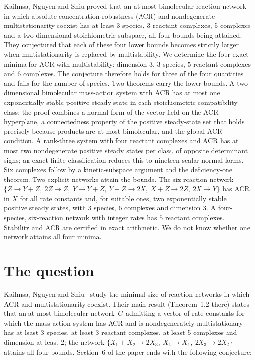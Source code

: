 \documentclass[11pt,a4paper]{report}
\begin{document}
\makepapertitle

\begin{paperabstract}
Kaihnsa, Nguyen and Shiu proved that an at-most-bimolecular reaction network in which absolute concentration
robustness (ACR) and nondegenerate multistationarity coexist has at least 3 species, 3 reactant complexes,
5 complexes and a two-dimensional stoichiometric subspace, all four bounds being attained. They conjectured that
each of these four lower bounds becomes strictly larger when multistationarity is replaced by multistability. We
determine the four exact minima for ACR with multistability: dimension $3$, $3$ species, $5$ reactant complexes and
$6$ complexes. The conjecture therefore holds for three of the four quantities and fails for the number of species.
Two theorems carry the lower bounds. A two-dimensional bimolecular mass-action system with ACR has at most one
exponentially stable positive steady state in each stoichiometric compatibility class; the proof combines a normal
form of the vector field on the ACR hyperplane, a connectedness property of the positive steady-state set that holds
precisely because products are at most bimolecular, and the global ACR condition. A rank-three system with four
reactant complexes and ACR has at most two nondegenerate positive steady states per class, of opposite determinant
signs; an exact finite classification reduces this to nineteen scalar normal forms. Six complexes follow by a
kinetic-subspace argument and the deficiency-one theorem. Two explicit networks attain the bounds. The six-reaction
network $\{Z\to Y+Z,\ 2Z\to Z,\ Y\to Y+Z,\ Y+Z\to 2X,\ X+Z\to 2Z,\ 2X\to Y\}$ has ACR in $X$ for all rate constants
and, for suitable ones, two exponentially stable positive steady states, with $3$ species, $6$ complexes and
dimension $3$. A four-species, six-reaction network with integer rates has $5$ reactant complexes. Stability and ACR
are certified in exact arithmetic. We do not know whether one network attains all four minima.
\end{paperabstract}

\section*{The question}

Kaihnsa, Nguyen and Shiu~\autocite{KNS2024} study the minimal size of reaction networks in which ACR and
multistationarity coexist. Their main result (Theorem~1.2 there) states that an at-most-bimolecular network~$G$
admitting a vector of rate constants for which the mass-action system has ACR and is nondegenerately
multistationary has at least 3 species, at least 3 reactant complexes, at least 5 complexes and dimension at least
2; the network $\{X_1+X_2\to 2X_3,\ X_3\to X_1,\ 2X_3\to 2X_2\}$ attains all four bounds. Section~6 of the paper
ends with the following conjecture:
\end{document}
